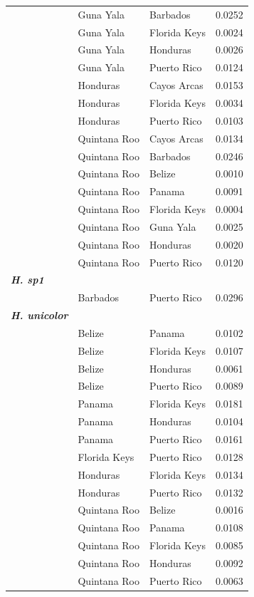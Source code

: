 \begin{xltabular}{\textwidth}{p{5cm}XXX}
    & Guna Yala & Barbados & 0.0252\\
    & Guna Yala & Florida Keys & 0.0024\\
    & Guna Yala & Honduras & 0.0026\\
    & Guna Yala & Puerto Rico & 0.0124\\
    & Honduras & Cayos Arcas & 0.0153\\
    & Honduras & Florida Keys & 0.0034\\
    & Honduras & Puerto Rico & 0.0103\\
    & Quintana Roo & Cayos Arcas & 0.0134\\
    & Quintana Roo & Barbados & 0.0246\\
    & Quintana Roo & Belize & 0.0010\\
    & Quintana Roo & Panama & 0.0091\\
    & Quintana Roo & Florida Keys & 0.0004\\
    & Quintana Roo & Guna Yala & 0.0025\\
    & Quintana Roo & Honduras & 0.0020\\
    & Quintana Roo & Puerto Rico & 0.0120\\
    \addlinespace
    \hline
    \hline
    \textbf{\emph{H. sp1}} &  &  &  \\
    \hline
    \hline
    & Barbados & Puerto Rico & 0.0296\\
    \addlinespace
    \hline
    \hline
    \textbf{\emph{H. unicolor}} &  &  &  \\
    \hline
    \hline
    & Belize & Panama & 0.0102\\
    & Belize & Florida Keys & 0.0107\\
    & Belize & Honduras & 0.0061\\
    & Belize & Puerto Rico & 0.0089\\
    & Panama & Florida Keys & 0.0181\\
    & Panama & Honduras & 0.0104\\
    & Panama & Puerto Rico & 0.0161\\
    & Florida Keys & Puerto Rico & 0.0128\\
    & Honduras & Florida Keys & 0.0134\\
    & Honduras & Puerto Rico & 0.0132\\
    & Quintana Roo & Belize & 0.0016\\
    & Quintana Roo & Panama & 0.0108\\
    & Quintana Roo & Florida Keys & 0.0085\\
    & Quintana Roo & Honduras & 0.0092\\
    & Quintana Roo & Puerto Rico & 0.0063\\
    \hline
\end{xltabular}